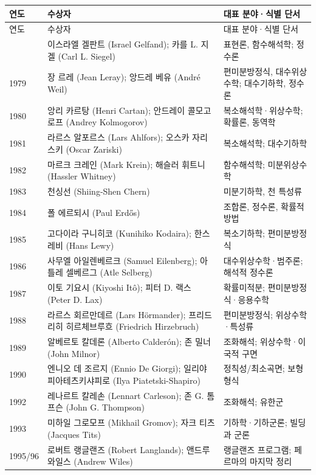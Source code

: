 \begin{center}
\footnotesize
\renewcommand{\arraystretch}{1.03}
\begin{longtable}{@{}L{0.09\textwidth}L{0.39\textwidth}L{0.44\textwidth}@{}}
\toprule
연도 & 수상자 & 대표 분야·식별 단서\\
\midrule
\endfirsthead
\toprule 연도 & 수상자 & 대표 분야·식별 단서\\ \midrule \endhead
\bottomrule{} & 이스라엘 겔판트 (Israel Gelfand); 카를 L. 지겔 (Carl L. Siegel) & 표현론, 함수해석학; 정수론\\
1979 & 장 르레 (Jean Leray); 앙드레 베유 (André Weil) & 편미분방정식, 대수위상수학; 대수기하학, 정수론\\
1980 & 앙리 카르탕 (Henri Cartan); 안드레이 콜모고로프 (Andrey Kolmogorov) & 복소해석학·위상수학; 확률론, 동역학\\
1981 & 라르스 알포르스 (Lars Ahlfors); 오스카 자리스키 (Oscar Zariski) & 복소해석학; 대수기하학\\
1982 & 마르크 크레인 (Mark Krein); 해슬러 휘트니 (Hassler Whitney) & 함수해석학; 미분위상수학\\
1983 & 천싱선 (Shiing-Shen Chern) & 미분기하학, 천 특성류\\
1984 & 폴 에르되시 (Paul Erdős) & 조합론, 정수론, 확률적 방법\\
1985 & 고다이라 구니히코 (Kunihiko Kodaira); 한스 레비 (Hans Lewy) & 복소기하학; 편미분방정식\\
1986 & 사무엘 아일렌베르크 (Samuel Eilenberg); 아틀레 셀베르그 (Atle Selberg) & 대수위상수학·범주론; 해석적 정수론\\
1987 & 이토 기요시 (Kiyoshi Itô); 피터 D. 랙스 (Peter D. Lax) & 확률미적분; 편미분방정식·응용수학\\
1988 & 라르스 회르만데르 (Lars Hörmander); 프리드리히 히르체브루흐 (Friedrich Hirzebruch) & 편미분방정식; 위상수학·특성류\\
1989 & 알베르토 칼데론 (Alberto Calderón); 존 밀너 (John Milnor) & 조화해석; 위상수학·이국적 구면\\
1990 & 엔니오 데 조르지 (Ennio De Giorgi); 일리야 피아테츠키샤피로 (Ilya Piatetski-Shapiro) & 정칙성/최소곡면; 보형형식\\
1992 & 레나르트 칼레손 (Lennart Carleson); 존 G. 톰프슨 (John G. Thompson) & 조화해석; 유한군\\
1993 & 미하일 그로모프 (Mikhail Gromov); 자크 티츠 (Jacques Tits) & 기하학·기하군론; 빌딩과 군론\\
1995/96 & 로버트 랭글랜즈 (Robert Langlands); 앤드루 와일스 (Andrew Wiles) & 랭글랜즈 프로그램; 페르마의 마지막 정리\\

\end{longtable}
\end{center}

